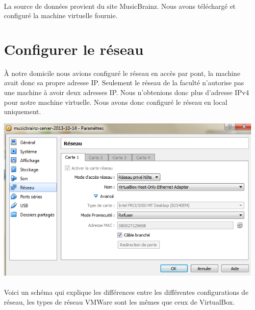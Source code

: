 \documentclass{report}
\begin{document}
	\paragraph{}{
		La source de données provient du site MusicBrainz. Nous avons téléchargé et configuré la machine virtuelle fournie.
	}


	\section*{Configurer le réseau}
		\paragraph{}{
			À notre domicile nous avions configuré le réseau en accès par pont, la machine avait donc sa propre adresse IP. Seulement le réseau de la faculté n’autorise pas une machine à avoir deux adresses IP. Nous n’obtenions donc plus d’adresse IPv4 pour notre machine virtuelle. Nous avons donc configuré le réseau en local uniquement.
		}

		\begin{center}
			\includegraphics[scale=0.79]{images/reseau-vb.png}
		\end{center}


		\paragraph{}{
			Voici un schéma qui explique les différences entre les différentes configurations de réseau, les types de réseau VMWare sont les mêmes que ceux de VirtualBox.
		}
\end{document}
